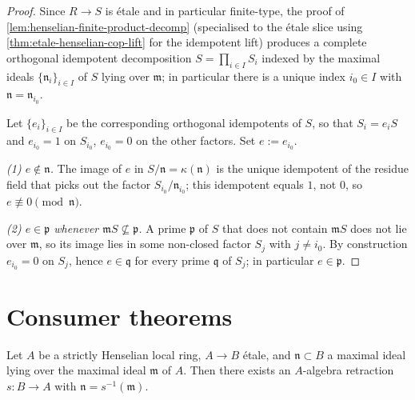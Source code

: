 \begin{proof}
  Since $R \to S$ is étale and in particular finite-type, the proof
  of \cref{lem:henselian-finite-product-decomp} (specialised to the
  étale slice using \cref{thm:etale-henselian-cop-lift} for the
  idempotent lift) produces a complete orthogonal idempotent
  decomposition $S = \prod_{i \in I} S_{i}$ indexed by the maximal
  ideals $\{ \mathfrak{n}_{i} \}_{i \in I}$ of $S$ lying over
  $\mathfrak{m}$; in particular there is a unique index
  $i_{0} \in I$ with $\mathfrak{n} = \mathfrak{n}_{i_{0}}$.

  Let $\{ e_{i} \}_{i \in I}$ be the corresponding orthogonal
  idempotents of $S$, so that $S_{i} = e_{i} S$ and $e_{i_{0}} = 1$
  on $S_{i_{0}}$, $e_{i_{0}} = 0$ on the other factors. Set
  $e := e_{i_{0}}$.

  \emph{(1) $e \notin \mathfrak{n}$.} The image of $e$ in
  $S/\mathfrak{n} = \kappa(\mathfrak{n})$ is the unique idempotent of
  the residue field that picks out the factor
  $S_{i_{0}}/\mathfrak{n}_{i_{0}}$; this idempotent equals $1$, not
  $0$, so $e \not\equiv 0 \pmod{\mathfrak{n}}$.

  \emph{(2) $e \in \mathfrak{p}$ whenever
  $\mathfrak{m} S \not\subseteq \mathfrak{p}$.} A prime
  $\mathfrak{p}$ of $S$ that does not contain $\mathfrak{m} S$ does
  not lie over $\mathfrak{m}$, so its image lies in some non-closed
  factor $S_{j}$ with $j \ne i_{0}$. By construction
  $e_{i_{0}} = 0$ on $S_{j}$, hence $e \in \mathfrak{q}$ for every
  prime $\mathfrak{q}$ of $S_{j}$; in particular $e \in
  \mathfrak{p}$.
\end{proof}

\section*{Consumer theorems}

\begin{theorem}
  \label{thm:strictly-henselian-good-retraction-skeleton}
  Let $A$ be a strictly Henselian local ring, $A \to B$ étale, and
  $\mathfrak{n} \subset B$ a maximal ideal lying over the maximal
  ideal $\mathfrak{m}$ of $A$. Then there exists an $A$-algebra
  retraction $s : B \to A$ with $\mathfrak{n} = s^{-1}(\mathfrak{m})$.
\end{theorem}

